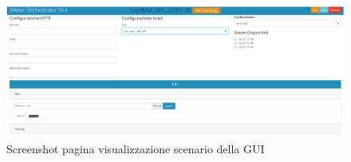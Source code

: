  \begin{figure}[H]
 	\centering
 	\includegraphics[width=\textwidth]{immagini/guishow}
 	\caption{Screenshot pagina visualizzazione scenario della GUI}
 	\label{img-guishow}
 \end{figure}